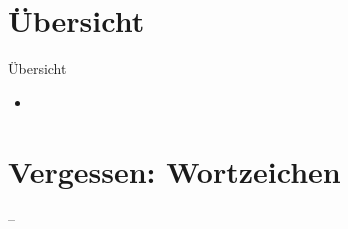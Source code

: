 \section{Übersicht}

\begin{frame}
  {Übersicht}
  \onslide<+->
  \begin{itemize}[<+->]
    \item \citet{Schaefer2018b}
  \end{itemize}
\end{frame}

\section[Wortzeichen]{Vergessen: Wortzeichen}

\begin{frame}
  {--}
  \onslide<+->
  \onslide<+->
  \begin{exe}
    \ex
    \begin{xlist}
    \end{xlist}
    \ex
    \begin{xlist}
    \end{xlist}
    \ex
    \begin{xlist}
    \end{xlist}
    \ex
    \begin{xlist}
    \end{xlist}
    \ex
    \begin{xlist}
    \end{xlist}
  \end{exe}
\end{frame}

